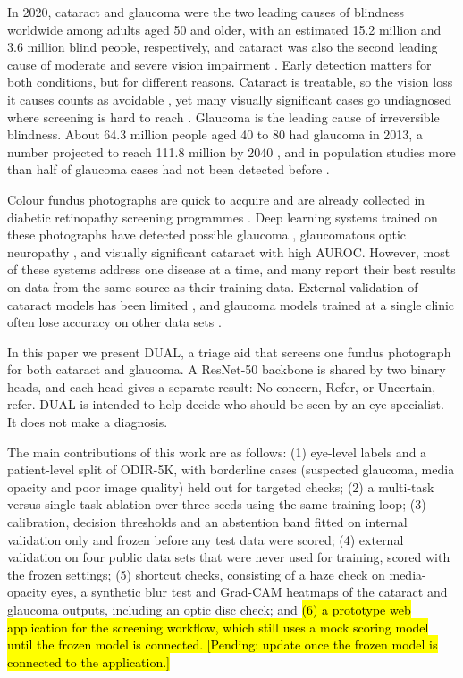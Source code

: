 \documentclass[conference,a4paper]{IEEEtran}
\newcommand{\pendingedit}[1]{\hl{#1}}
\begin{document}
In 2020, cataract and glaucoma were the two leading causes of blindness worldwide among adults aged
50 and older, with an estimated 15.2 million and 3.6 million blind people, respectively, and
cataract was also the second leading cause of moderate and severe vision impairment \cite{ref1}.
Early detection matters for both conditions, but for different reasons. Cataract is treatable, so
the vision loss it causes counts as avoidable \cite{ref1}, yet many visually significant cases go
undiagnosed where screening is hard to reach \cite{ref2}. Glaucoma is the leading cause of
irreversible blindness. About 64.3 million people aged 40 to 80 had glaucoma in 2013, a number
projected to reach 111.8 million by 2040 \cite{ref3}, and in population studies more than half of
glaucoma cases had not been detected before \cite{ref4}.

Colour fundus photographs are quick to acquire and are already collected in diabetic retinopathy
screening programmes \cite{ref5}. Deep learning systems trained on these photographs have detected
possible glaucoma \cite{ref5}, glaucomatous optic neuropathy \cite{ref6}, \cite{ref7} and visually
significant cataract \cite{ref2} with high AUROC. However, most of these systems address one disease
at a time, and many report their best results on data from the same source as their training data.
External validation of cataract models has been limited \cite{ref8}, and glaucoma models trained at
a single clinic often lose accuracy on other data sets \cite{ref9}.

In this paper we present DUAL, a triage aid that screens one fundus photograph for both cataract and
glaucoma. A ResNet-50 backbone is shared by two binary heads, and each head gives a separate result:
No concern, Refer, or Uncertain, refer. DUAL is intended to help decide who should be seen by an eye
specialist. It does not make a diagnosis.

The main contributions of this work are as follows: (1) eye-level labels and a patient-level split
of ODIR-5K, with borderline cases (suspected glaucoma, media opacity and poor image quality) held
out for targeted checks; (2) a multi-task versus single-task ablation over three seeds using the
same training loop; (3) calibration, decision thresholds and an abstention band fitted on internal
validation only and frozen before any test data were scored; (4) external validation on four public
data sets that were never used for training, scored with the frozen settings; (5) shortcut checks,
consisting of a haze check on media-opacity eyes, a synthetic blur test and Grad-CAM \cite{ref10}
heatmaps of the cataract and glaucoma outputs, including an optic disc check; and \pendingedit{(6) a prototype
web application for the screening workflow, which still uses a mock scoring model until the frozen
model is connected. [Pending: update once the frozen model is connected to the application.]}
\end{document}
